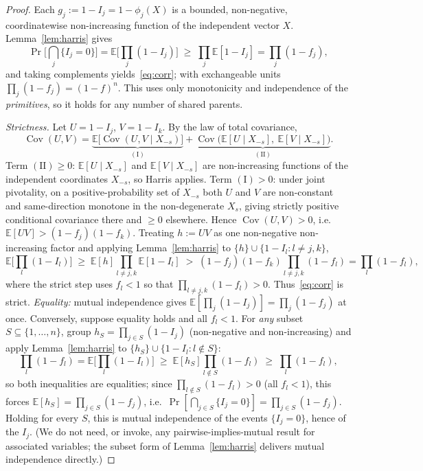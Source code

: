 \documentclass[11pt]{article}
\theoremstyle{definition}
\theoremstyle{remark}
\newcommand{\fesc}{f}
\begin{document}
\begin{proof}
Each $g_j:=1-I_j=1-\phi_j(X)$ is a bounded, non-negative, coordinatewise non-increasing function of
the independent vector $X$. Lemma~\ref{lem:harris} gives
\[
\Pr\!\Big[\textstyle\bigcap_{j}\{I_j=0\}\Big]
=\mathbb{E}\Big[\textstyle\prod_{j}(1-I_j)\Big]
\;\ge\;\prod_{j}\mathbb{E}[1-I_j]=\prod_{j}(1-\fesc_j),
\]
and taking complements yields~\eqref{eq:corr}; with exchangeable units $\prod_j(1-\fesc_j)=(1-\fesc)^n$.
This uses only monotonicity and independence of the \emph{primitives}, so it holds for any number of
shared parents.

\emph{Strictness.} Let $U=1-I_j$, $V=1-I_k$. By the law of total covariance,
\[
\operatorname{Cov}(U,V)=\underbrace{\mathbb{E}\big[\operatorname{Cov}(U,V\mid X_{-s})\big]}_{(\mathrm I)}
+\underbrace{\operatorname{Cov}\big(\mathbb{E}[U\mid X_{-s}],\ \mathbb{E}[V\mid X_{-s}]\big)}_{(\mathrm{II})}.
\]
Term $(\mathrm{II})\ge0$: $\mathbb{E}[U\mid X_{-s}]$ and $\mathbb{E}[V\mid X_{-s}]$ are non-increasing
functions of the independent coordinates $X_{-s}$, so Harris applies. Term $(\mathrm{I})>0$: under
joint pivotality, on a positive-probability set of $X_{-s}$ both $U$ and $V$ are non-constant and
same-direction monotone in the non-degenerate $X_s$, giving strictly positive conditional covariance
there and $\ge0$ elsewhere. Hence $\operatorname{Cov}(U,V)>0$, i.e.\
$\mathbb{E}[UV]>(1-\fesc_j)(1-\fesc_k)$. Treating $h:=UV$ as one non-negative non-increasing factor and
applying Lemma~\ref{lem:harris} to $\{h\}\cup\{1-I_l:l\neq j,k\}$,
\[
\mathbb{E}\Big[\textstyle\prod_l(1-I_l)\Big]\;\ge\;\mathbb{E}[h]\!\!\prod_{l\neq j,k}\!\!\mathbb{E}[1-I_l]
\;>\;(1-\fesc_j)(1-\fesc_k)\!\!\prod_{l\neq j,k}\!\!(1-\fesc_l)=\prod_l(1-\fesc_l),
\]
where the strict step uses $\fesc_l<1$ so that $\prod_{l\neq j,k}(1-\fesc_l)>0$. Thus~\eqref{eq:corr} is
strict. \emph{Equality:} mutual independence gives $\mathbb{E}[\prod_j(1-I_j)]=\prod_j(1-\fesc_j)$ at
once. Conversely, suppose equality holds and all $\fesc_l<1$. For \emph{any} subset $S\subseteq\{1,\dots,n\}$,
group $h_S=\prod_{j\in S}(1-I_j)$ (non-negative and non-increasing) and apply Lemma~\ref{lem:harris} to
$\{h_S\}\cup\{1-I_l:l\notin S\}$:
\[
\prod_l(1-\fesc_l)=\mathbb{E}\Big[\textstyle\prod_l(1-I_l)\Big]\;\ge\;\mathbb{E}[h_S]\!\!\prod_{l\notin S}\!(1-\fesc_l)\;\ge\;\prod_l(1-\fesc_l),
\]
so both inequalities are equalities; since $\prod_{l\notin S}(1-\fesc_l)>0$ (all $\fesc_l<1$), this
forces $\mathbb{E}[h_S]=\prod_{j\in S}(1-\fesc_j)$, i.e.\ $\Pr[\bigcap_{j\in S}\{I_j=0\}]=\prod_{j\in S}(1-\fesc_j)$.
Holding for every $S$, this is mutual independence of the events $\{I_j=0\}$, hence of the $I_j$. (We do
not need, or invoke, any pairwise-implies-mutual result for associated variables; the subset form of
Lemma~\ref{lem:harris} delivers mutual independence directly.)
\end{proof}
\end{document}
